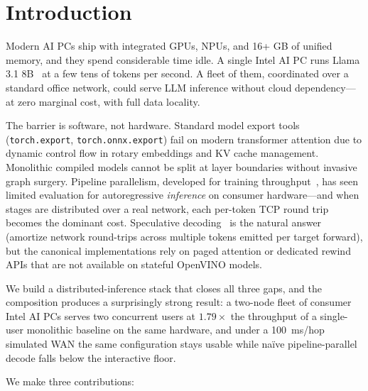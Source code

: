 \documentclass[11pt]{article}
\newcommand{\brk}{\discretionary{}{}{}}
\begin{document}
\section{Introduction}
\label{sec:intro}

Modern AI PCs ship with integrated GPUs, NPUs, and 16+ GB of unified memory, and they spend considerable time idle. A single Intel AI PC runs Llama 3.1 8B~\cite{grattafiori2024llama} at a few tens of tokens per second. A fleet of them, coordinated over a standard office network, could serve LLM inference without cloud dependency---at zero marginal cost, with full data locality.

The barrier is software, not hardware. Standard model export tools (\texttt{torch.export}, \texttt{torch.\brk onnx.\brk export}) fail on modern transformer attention due to dynamic control flow in rotary embeddings and KV cache management. Monolithic compiled models cannot be split at layer boundaries without invasive graph surgery. Pipeline parallelism, developed for training throughput~\cite{huang2019gpipe, narayanan2019pipedream}, has seen limited evaluation for autoregressive \emph{inference} on consumer hardware---and when stages are distributed over a real network, each per-token TCP round trip becomes the dominant cost. Speculative decoding~\cite{leviathan2023fast, chen2023accelerating} is the natural answer (amortize network round-trips across multiple tokens emitted per target forward), but the canonical implementations rely on paged attention or dedicated rewind APIs that are not available on stateful OpenVINO models.

We build a distributed-inference stack that closes all three gaps, and the composition produces a surprisingly strong result: a two-node fleet of consumer Intel AI PCs serves two concurrent users at $1.79\times$ the throughput of a single-user monolithic baseline on the same hardware, and under a 100~ms/hop simulated WAN the same configuration stays usable while naïve pipeline-parallel decode falls below the interactive floor.

We make three contributions:
\end{document}
